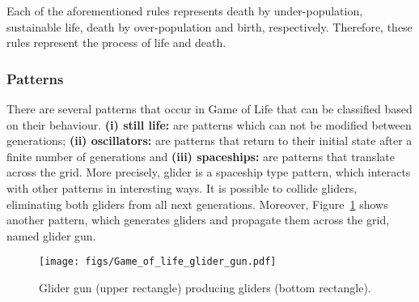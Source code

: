 \documentclass[12pt]{article}
\begin{document}
Each of the aforementioned rules represents death by under-population, sustainable life, death by over-population and birth, respectively. Therefore, these rules represent the process of life and death.


\subsubsection{Patterns}

There are several patterns that occur in Game of Life that can be classified based on their behaviour. \textbf{(i) still life:} are patterns which can not be modified between generations; \textbf{(ii) oscillators:} are patterns that return to their initial state after a finite number of generations and \textbf{(iii) spaceships:} are patterns that translate across the grid. More precisely, glider is a spaceship type pattern, which interacts with other patterns in interesting ways. It is possible to collide gliders, eliminating both gliders from all next generations. Moreover, Figure~\ref{fig:glider_gun} shows another pattern, which generates gliders and propagate them across the grid, named glider gun.


\begin{figure}[h]
    \centering
    \texttt{[image: figs/Game\_of\_life\_glider\_gun.pdf]}
    \caption{Glider gun (upper rectangle) producing gliders (bottom rectangle).}
    \label{fig:glider_gun}
\end{figure}
\end{document}
